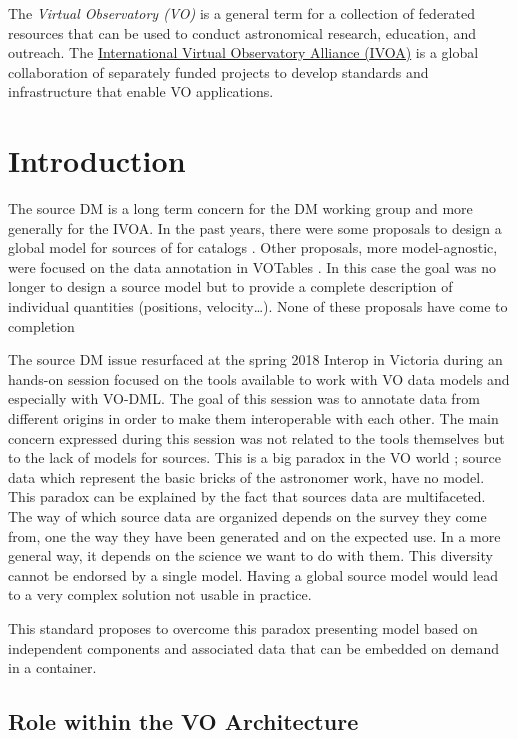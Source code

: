 \documentclass[11pt,a4paper]{ivoa}
\begin{document}
The \emph{Virtual Observatory (VO)} is a
general term for a collection of federated resources that can be used
to conduct astronomical research, education, and outreach.
The \href{http://www.ivoa.net}{International
Virtual Observatory Alliance (IVOA)} is a global
collaboration of separately funded projects to develop standards and
infrastructure that enable VO applications.


\section{Introduction}

The source DM is a long term concern for the DM working group and more generally for the IVOA.
In the past years, there were some proposals to design a global model for sources \citep{wd:jesusdm} of for catalogs \citep{wd:catalog}.
Other proposals, more model-agnostic, were focused on the data annotation in VOTables \citep{note:stcvot} \citep{note:seb}. In this case the goal was no longer to design a source model but to provide a complete description of  individual quantities (positions, velocity…).
None of these proposals have come to completion

The source DM issue resurfaced at the spring 2018 Interop in Victoria during an hands-on session focused on the tools available to work with VO data models and especially with VO-DML. The goal of this session was to annotate data from different origins in order to make them interoperable with each other. The main concern expressed during this session was not related to the tools themselves but to the lack of models for sources. 
This is a big paradox in the VO world ; source data which represent the basic bricks of the astronomer work, have no model. This paradox can be explained by the fact that sources data are multifaceted. The way of which source data are organized depends on the survey they come from, one the way they have been generated  and on the expected use. In a more general way, it depends on the science we want to do with them. This diversity cannot be endorsed by a single model. Having a global source model would lead to a very complex solution not usable in practice.

This standard proposes to overcome this paradox presenting model based on independent components and associated data that can be embedded on demand in a container.


\subsection{Role within the VO Architecture}
\end{document}
